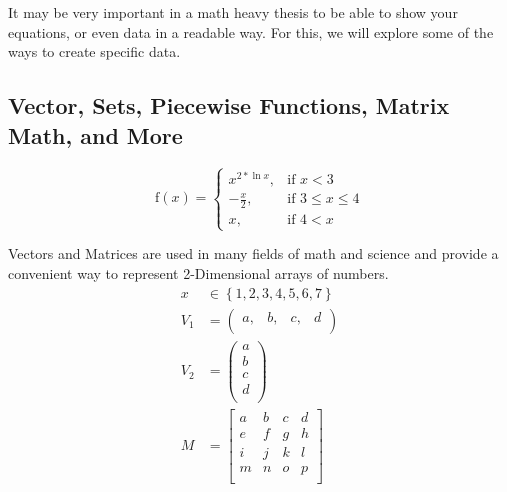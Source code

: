 		It may be very important in a math heavy thesis to be able to show your equations, or even data in a readable way. For this, we will explore some of the ways to create specific data.
    
        \subsection{Vector, Sets, Piecewise Functions, Matrix Math, and More}
        
			\begin{equation}
				\text{f}(x) = 
					\begin{cases}
						x^{2*\ln{x}},&\text{if }x<3\\
						-\frac{x}{2},&\text{if }3\leq{}x\leq{}4\\
						x,&\text{if }4<x
					\end{cases}
			\end{equation}
        
			Vectors and Matrices are used in many fields of math and science and provide a convenient way to represent 2-Dimensional arrays of numbers.
			\begin{align}
				x&\in{}\left\{1,2,3,4,5,6,7\right\}\\
				V_{1} &= {\left(
				\begin{array}{cccc}
					a, & b, & c, & d\\
				\end{array}
				\right)}\\
				V_{2} &= \left(
				\begin{array}{c}
					a \\
					b \\
					c \\
					d \\
				\end{array}
				\right)\\
				M &= {\left[
				\begin{array}{cccc}
					a & b & c & d\\
					e & f & g & h\\
					i & j & k & l\\
					m & n & o & p\\
				\end{array}
				\right]}
			\end{align}

	\printreferences %
